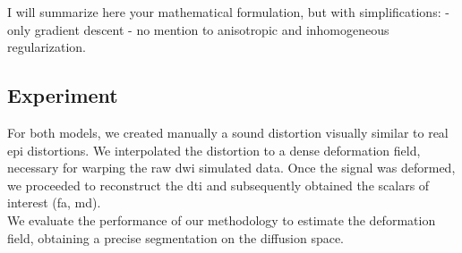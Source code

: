 I will summarize here your mathematical formulation, but with simplifications:
- only gradient descent
- no mention to anisotropic and inhomogeneous regularization.

\subsection{Experiment}
%
For both models, we created manually a sound distortion visually similar
to real \ac{epi} distortions. We interpolated the distortion to a 
dense deformation field, necessary for warping the raw \ac{dwi} simulated
data. Once the signal was deformed, we proceeded to reconstruct the
\ac{dti} and subsequently obtained the scalars of interest (\ac{fa}, \ac{md}).\\

We evaluate the performance of our methodology to estimate the deformation
field, obtaining a precise segmentation on the diffusion space.
